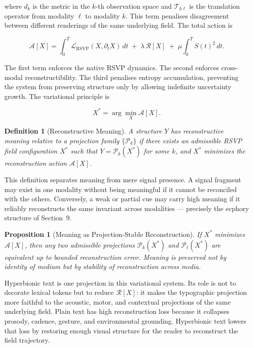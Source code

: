 \documentclass[12pt, a4paper]{article}
\newtheorem{definition}{Definition}
\newtheorem{proposition}{Proposition}
\begin{document}
where $d_k$ is the metric in the $k$-th observation space and $\mathcal{T}_{k\ell}$ is the translation operator from modality $\ell$ to modality $k$. This term penalises disagreement between different renderings of the same underlying field. The total action is

\begin{equation}
\mathcal{A}[X]
= \int_0^T \mathcal{L}_{\mathrm{RSVP}}(X, \partial_t X)\, dt
\;+\; \lambda\, \mathcal{R}[X]
\;+\; \mu \int_0^T S(t)^2\, dt.
\label{eq:TotalAction}
\end{equation}

The first term enforces the native RSVP dynamics. The second enforces cross-modal reconstructibility. The third penalises entropy accumulation, preventing the system from preserving structure only by allowing indefinite uncertainty growth. The variational principle is

\begin{equation}
X^* = \arg\min_X \mathcal{A}[X].
\label{eq:VarPrinciple}
\end{equation}

\begin{definition}[Reconstructive Meaning]
\label{def:reconmeaning}
A structure $Y$ has reconstructive meaning relative to a projection family $\{\mathcal{P}_k\}$ if there exists an admissible RSVP field configuration $X^*$ such that $Y = \mathcal{P}_k(X^*)$ for some $k$, and $X^*$ minimizes the reconstruction action $\mathcal{A}[X]$.
\end{definition}

This definition separates meaning from mere signal presence. A signal fragment may exist in one modality without being meaningful if it cannot be reconciled with the others. Conversely, a weak or partial cue may carry high meaning if it reliably reconstructs the same invariant across modalities --- precisely the ecphory structure of Section~9.

\begin{proposition}[Meaning as Projection-Stable Reconstruction]
If $X^*$ minimizes $\mathcal{A}[X]$, then any two admissible projections $\mathcal{P}_k(X^*)$ and $\mathcal{P}_\ell(X^*)$ are equivalent up to bounded reconstruction error. Meaning is preserved not by identity of medium but by stability of reconstruction across media.
\end{proposition}

Hyperbionic text is one projection in this variational system. Its role is not to decorate lexical tokens but to reduce $\mathcal{R}[X]$: it makes the typographic projection more faithful to the acoustic, motor, and contextual projections of the same underlying field. Plain text has high reconstruction loss because it collapses prosody, cadence, gesture, and environmental grounding. Hyperbionic text lowers that loss by restoring enough visual structure for the reader to reconstruct the field trajectory.
\end{document}
